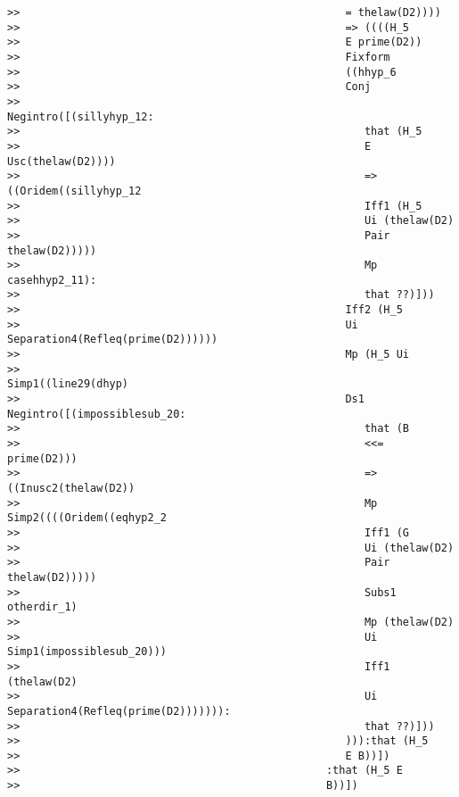 \documentclass[12pt]{article}
\begin{document}
\begin{verbatim}
>>                                                   = thelaw(D2))))
>>                                                   => ((((H_5
>>                                                   E prime(D2))
>>                                                   Fixform
>>                                                   ((hhyp_6
>>                                                   Conj
>>                                                   Negintro([(sillyhyp_12:
>>                                                      that (H_5
>>                                                      E Usc(thelaw(D2))))
>>                                                      => ((Oridem((sillyhyp_12
>>                                                      Iff1 (H_5
>>                                                      Ui (thelaw(D2)
>>                                                      Pair thelaw(D2)))))
>>                                                      Mp casehhyp2_11):
>>                                                      that ??)]))
>>                                                   Iff2 (H_5
>>                                                   Ui Separation4(Refleq(prime(D2))))))
>>                                                   Mp (H_5 Ui
>>                                                   Simp1((line29(dhyp)
>>                                                   Ds1 Negintro([(impossiblesub_20:
>>                                                      that (B
>>                                                      <<= prime(D2)))
>>                                                      => ((Inusc2(thelaw(D2))
>>                                                      Mp Simp2((((Oridem((eqhyp2_2
>>                                                      Iff1 (G
>>                                                      Ui (thelaw(D2)
>>                                                      Pair thelaw(D2)))))
>>                                                      Subs1 otherdir_1)
>>                                                      Mp (thelaw(D2)
>>                                                      Ui Simp1(impossiblesub_20)))
>>                                                      Iff1 (thelaw(D2)
>>                                                      Ui Separation4(Refleq(prime(D2))))))):
>>                                                      that ??)]))
>>                                                   ))):that (H_5
>>                                                   E B))])
>>                                                :that (H_5 E
>>                                                B))])

\end{verbatim}
\end{document}
